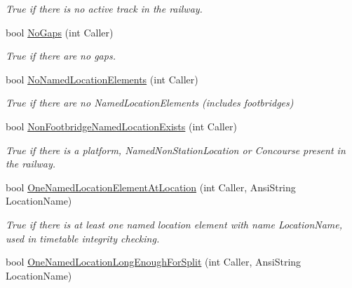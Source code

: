 \begin{DoxyCompactItemize}
\begin{DoxyCompactList}\small\item\em True if there is no active track in the railway. \end{DoxyCompactList}\item 
\mbox{\label{class_t_track_ab9e1aa42b1d6399d97390f5068bf68b0}} 
bool \mbox{\hyperlink{class_t_track_ab9e1aa42b1d6399d97390f5068bf68b0}{No\+Gaps}} (int Caller)
\begin{DoxyCompactList}\small\item\em True if there are no gaps. \end{DoxyCompactList}\item 
\mbox{\label{class_t_track_ab079bfd6871c5337b29297e7bc2cfe8b}} 
bool \mbox{\hyperlink{class_t_track_ab079bfd6871c5337b29297e7bc2cfe8b}{No\+Named\+Location\+Elements}} (int Caller)
\begin{DoxyCompactList}\small\item\em True if there are no Named\+Location\+Elements (includes footbridges) \end{DoxyCompactList}\item 
\mbox{\label{class_t_track_adb8c5f303e4977a8ea92c7b706a1d4e5}} 
bool \mbox{\hyperlink{class_t_track_adb8c5f303e4977a8ea92c7b706a1d4e5}{Non\+Footbridge\+Named\+Location\+Exists}} (int Caller)
\begin{DoxyCompactList}\small\item\em True if there is a platform, Named\+Non\+Station\+Location or Concourse present in the railway. \end{DoxyCompactList}\item 
\mbox{\label{class_t_track_a7eba939947b4c035a191ecaaf1b0bb9a}} 
bool \mbox{\hyperlink{class_t_track_a7eba939947b4c035a191ecaaf1b0bb9a}{One\+Named\+Location\+Element\+At\+Location}} (int Caller, Ansi\+String Location\+Name)
\begin{DoxyCompactList}\small\item\em True if there is at least one named location element with name \textquotesingle{}Location\+Name\textquotesingle{}, used in timetable integrity checking. \end{DoxyCompactList}\item 
bool \mbox{\hyperlink{class_t_track_a9d209cb6e24f67ba12020440a5e42347}{One\+Named\+Location\+Long\+Enough\+For\+Split}} (int Caller, Ansi\+String Location\+Name)

\end{DoxyCompactItemize}
